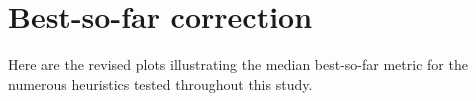 
\chapter{Best-so-far correction}
\label{Appendix:BestSoFarCorrection}

Here are the revised plots illustrating the median best-so-far metric for the numerous heuristics tested throughout this study.



